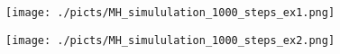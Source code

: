 \begin{frame}[plain]

	\begin{center}
		\begin{figure}\texttt{[image: ./picts/MH\_simululation\_1000\_steps\_ex1.png]}\end{figure}	
	\end{center}	
		
\end{frame}

\begin{frame}[plain]

	\begin{center}
		\begin{figure}\texttt{[image: ./picts/MH\_simululation\_1000\_steps\_ex2.png]}\end{figure}	
	\end{center}	
		
\end{frame}


